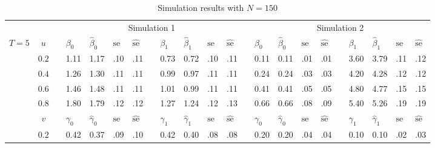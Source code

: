 \documentclass[12pt]{article}
\begin{document}
\begin{sidewaystable}
\footnotesize
\caption{Simulation results with $N = 150$}
\label{sim150}
\centering
\begin{tabular}{cc
m{0.01cm}m{0.45cm}m{0.45cm}m{0.2cm}m{0.2cm}
m{0.01cm}m{0.45cm}m{0.45cm}m{0.2cm}m{0.2cm}
m{0.01cm}m{0.45cm}m{0.45cm}m{0.2cm}m{0.2cm}
m{0.01cm}m{0.45cm}m{0.45cm}m{0.2cm}m{0.2cm}
}
\hline
\hline
&&& \multicolumn{9}{c}{Simulation 1} & & \multicolumn{9}{c}{Simulation 2}\\
\cline{4-12}\cline{14-22}
$T = 5$ & $u$ && 
	$\beta_0$ & $\hat\beta_0$ & $\text{se}$ & $\hat{\text{se}}$ &&
	$\beta_1$ & $\hat\beta_1$ & $\text{se}$ & $\hat{\text{se}}$ &&
	$\beta_0$ & $\hat\beta_0$ & $\text{se}$ & $\hat{\text{se}}$ &&
	$\beta_1$ & $\hat\beta_1$ & $\text{se}$ & $\hat{\text{se}}$\\
\cline{4-7}\cline{9-12}\cline{14-17}\cline{19-22}
& $0.2$ && 1.11 & 1.17 & .10 & .11	&& 0.73 & 0.72 & .10 & .11	&& 0.11 & 0.11 & .01 & .01	&& 3.60 & 3.79 & .11 & .12\\
& $0.4$ && 1.26 & 1.30 & .11 & .11	&& 0.99 & 0.97 & .11 & .11	&& 0.24 & 0.24 & .03 & .03	&& 4.20 & 4.28 & .12 & .12\\
& $0.6$ && 1.46 & 1.48 & .11 & .11	&& 1.01 & 0.99 & .11 & .11	&& 0.41 & 0.41 & .05 & .05	&& 4.80 & 4.77 & .15 & .15\\
& $0.8$ && 1.80 & 1.79 & .12 & .12	&& 1.27 & 1.24 & .12 & .13	&& 0.66 & 0.66 & .08 & .09	&& 5.40 & 5.26 & .19 & .19\\
& $v$ && 
	$\gamma_0$ & $\hat\gamma_0$ & $\text{se}$ & $\hat{\text{se}}$ &&
	$\gamma_1$ & $\hat\gamma_1$ & $\text{se}$ & $\hat{\text{se}}$ &&
	$\gamma_0$ & $\hat\gamma_0$ & $\text{se}$ & $\hat{\text{se}}$ &&
	$\gamma_1$ & $\hat\gamma_1$ & $\text{se}$ & $\hat{\text{se}}$\\
\cline{4-7}\cline{9-12}\cline{14-17}\cline{19-22}
& $0.2$ && 0.42 & 0.37 & .09 & .10	&& 0.42 & 0.40 & .08 & .08	&& 0.20 & 0.20 & .04 & .04	&& 0.10 & 0.10 & .02 & .03\\

\end{tabular}
\end{sidewaystable}
\end{document}
